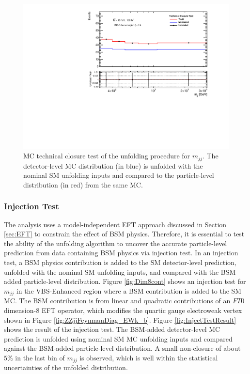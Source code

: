 \begin{figure}[!htb]
\centering
\includegraphics[width=.6\textwidth]{figures/Analysis/Unfolding/technical_closure_VBS_Enhanced.pdf}
\caption{MC technical closure test of the unfolding procedure for $m_{jj}$. The detector-level MC distribution (in blue) is unfolded with the nominal SM unfolding inputs and compared to the particle-level distribution (in red) from the same MC.\label{fig:unfolding_technical_closure}}
\end{figure}

\subsubsection{Injection Test}
\label{subsubsec:InjectionTest}
The analysis uses a model-independent EFT approach discussed in Section \ref{sec:EFT} to constrain the effect of BSM physics. Therefore, it is essential to test the ability of the unfolding algorithm to uncover the accurate particle-level prediction from data containing BSM physics via injection test. In an injection test, a BSM physics contribution is added to the SM detector-level prediction, unfolded with the nominal SM unfolding inputs, and compared with the BSM-added particle-level distribution. Figure \ref{fig:Dim8cont} shows an injection test for $m_{jj}$ in the VBS-Enhanced region where a BSM contribution is added to the SM MC. The BSM contribution is from linear and quadratic contributions of an $FT0$ dimension-8 EFT operator, which modifies the quartic gauge electroweak vertex shown in Figure \ref{fig:ZZjjFeynmanDiag_EWk_b}. Figure \ref{fig:InjectTestResult} shows the result of the injection test. The BSM-added detector-level MC prediction is unfolded using nominal SM MC unfolding inputs and compared against the BSM-added particle-level distribution. A small non-closure of about $5\%$ in the last bin of $m_{jj}$ is observed, which is well within the statistical uncertainties of the unfolded distribution.

